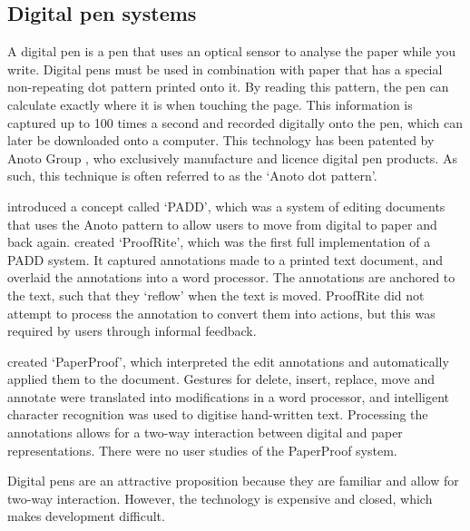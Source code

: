 \subsection{Digital pen systems}
A digital pen is a pen that uses an optical sensor to analyse the paper while you write. Digital pens must be used in
combination with paper that has a special non-repeating dot pattern printed onto it. By reading this pattern, the pen
can calculate exactly where it is when touching the page. This information is captured up to 100 times a second
and recorded digitally onto the pen, which can later be downloaded onto a computer. This technology has been patented
by Anoto Group \citep{Fahraeus2003}, who exclusively manufacture and licence digital pen products. As such, this
technique is often referred to as the `Anoto dot pattern'.

\citet{Guimbretiere2003} introduced a concept called `PADD', which was a system of editing documents that uses the
Anoto pattern to allow users to move from digital to paper and back again. \citet{Conroy2004} created `ProofRite',
which was the first full implementation of a PADD system. It captured annotations made to a printed text document, and
overlaid the annotations into a word processor. The annotations are anchored to the text, such that they `reflow' when
the text is moved.  ProofRite did not attempt to process the annotation to convert them into actions, but this was
required by users through informal feedback.

\citet{Weibel2008} created `PaperProof', which interpreted the edit annotations and automatically applied them to the
document. Gestures for delete, insert, replace, move and annotate were translated into modifications in a word
processor, and intelligent character recognition was used to digitise hand-written text. Processing the annotations
allows for a two-way interaction between digital and paper representations. There were no user studies of the
PaperProof system.

Digital pens are an attractive proposition because they are familiar and allow for two-way interaction. However, the
technology is expensive and closed, which makes development difficult.

